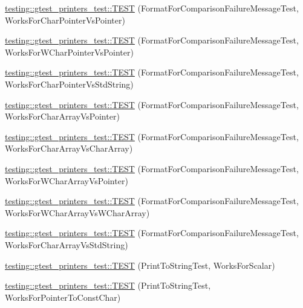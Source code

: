 \begin{DoxyCompactItemize}
\item 
\hyperlink{namespacetesting_1_1gtest__printers__test_a1694d4063da702f5379495d3cb2cbc91}{testing\+::gtest\+\_\+printers\+\_\+test\+::\+T\+E\+ST} (Format\+For\+Comparison\+Failure\+Message\+Test, Works\+For\+Char\+Pointer\+Vs\+Pointer)
\item 
\hyperlink{namespacetesting_1_1gtest__printers__test_a735171f4ba0a9dffee9c4c7321107822}{testing\+::gtest\+\_\+printers\+\_\+test\+::\+T\+E\+ST} (Format\+For\+Comparison\+Failure\+Message\+Test, Works\+For\+W\+Char\+Pointer\+Vs\+Pointer)
\item 
\hyperlink{namespacetesting_1_1gtest__printers__test_ab5a910170489276c14b817b70d4feb96}{testing\+::gtest\+\_\+printers\+\_\+test\+::\+T\+E\+ST} (Format\+For\+Comparison\+Failure\+Message\+Test, Works\+For\+Char\+Pointer\+Vs\+Std\+String)
\item 
\hyperlink{namespacetesting_1_1gtest__printers__test_ac25834e0463cf9f3d231db24e7b220e5}{testing\+::gtest\+\_\+printers\+\_\+test\+::\+T\+E\+ST} (Format\+For\+Comparison\+Failure\+Message\+Test, Works\+For\+Char\+Array\+Vs\+Pointer)
\item 
\hyperlink{namespacetesting_1_1gtest__printers__test_aba32640344f0186de5fbb6bb47e0c5a5}{testing\+::gtest\+\_\+printers\+\_\+test\+::\+T\+E\+ST} (Format\+For\+Comparison\+Failure\+Message\+Test, Works\+For\+Char\+Array\+Vs\+Char\+Array)
\item 
\hyperlink{namespacetesting_1_1gtest__printers__test_a1e95289500400eff5fdcd45c5864a6d2}{testing\+::gtest\+\_\+printers\+\_\+test\+::\+T\+E\+ST} (Format\+For\+Comparison\+Failure\+Message\+Test, Works\+For\+W\+Char\+Array\+Vs\+Pointer)
\item 
\hyperlink{namespacetesting_1_1gtest__printers__test_af4b502fb5745d2ee0bfb81d1c8eb95f6}{testing\+::gtest\+\_\+printers\+\_\+test\+::\+T\+E\+ST} (Format\+For\+Comparison\+Failure\+Message\+Test, Works\+For\+W\+Char\+Array\+Vs\+W\+Char\+Array)
\item 
\hyperlink{namespacetesting_1_1gtest__printers__test_ac2300073f401f783ff7b1ef97d2cbd6d}{testing\+::gtest\+\_\+printers\+\_\+test\+::\+T\+E\+ST} (Format\+For\+Comparison\+Failure\+Message\+Test, Works\+For\+Char\+Array\+Vs\+Std\+String)
\item 
\hyperlink{namespacetesting_1_1gtest__printers__test_a5d1bc4b12c18ccaec2ced9f45c092567}{testing\+::gtest\+\_\+printers\+\_\+test\+::\+T\+E\+ST} (Print\+To\+String\+Test, Works\+For\+Scalar)
\item 
\hyperlink{namespacetesting_1_1gtest__printers__test_a68100148758516ebab9c761ca7778586}{testing\+::gtest\+\_\+printers\+\_\+test\+::\+T\+E\+ST} (Print\+To\+String\+Test, Works\+For\+Pointer\+To\+Const\+Char)

\end{DoxyCompactItemize}
